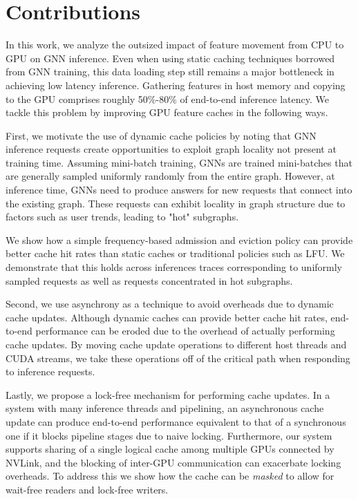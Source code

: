 \section{Contributions}
In this work, we analyze the outsized impact of feature movement from CPU to GPU on GNN inference. 
Even when using static caching techniques borrowed from GNN training, this data loading step still remains a major bottleneck in achieving low latency inference. Gathering features in host memory and copying to the GPU comprises roughly 50\%-80\% of end-to-end inference latency. We tackle this problem by improving GPU feature caches in the following ways.

First, we motivate the use of dynamic cache policies by noting that GNN inference requests create opportunities to exploit graph locality not present at training time. Assuming mini-batch training, GNNs are trained mini-batches that are generally sampled uniformly randomly from the entire graph. However, at inference time, GNNs need to produce answers for new requests that connect into the existing graph. These requests can exhibit locality in graph structure due to factors such as user trends, leading to "hot" subgraphs.

We show how a simple frequency-based admission and eviction policy can provide better cache hit rates than static caches or traditional policies such as LFU. We demonstrate that this holds across inferences traces corresponding to uniformly sampled requests as well as requests concentrated in hot subgraphs.

Second, we use asynchrony as a technique to avoid overheads due to dynamic cache updates. Although dynamic caches can provide better cache hit rates, end-to-end performance can be eroded due to the overhead of actually performing cache updates. By moving cache update operations to different host threads and CUDA streams, we take these operations off of the critical path when responding to inference requests. 

Lastly, we propose a lock-free mechanism for performing cache updates. In a system with many inference threads and pipelining, an asynchronous cache update can produce end-to-end performance equivalent to that of a synchronous one if it blocks pipeline stages due to naive locking. Furthermore, our system supports sharing of a single logical cache among multiple GPUs connected by NVLink, and the blocking of inter-GPU communication can exacerbate locking overheads. To address this we show how the cache can be \textit{masked} to allow for wait-free readers and lock-free writers.
